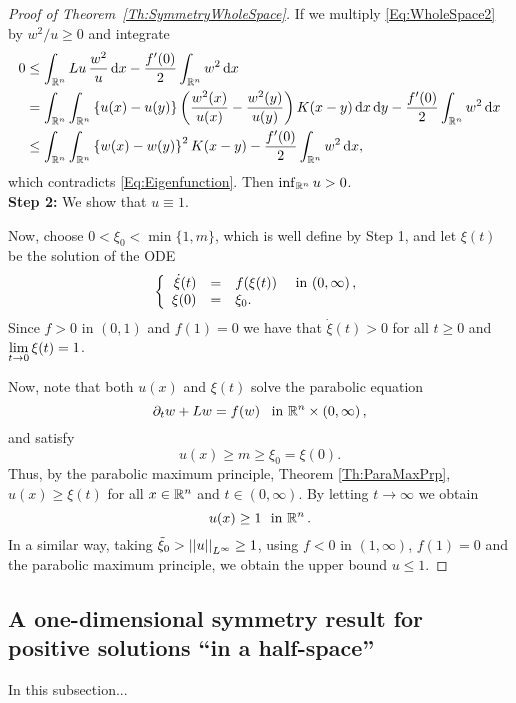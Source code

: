 \begin{proof}[Proof of Theorem~\ref{Th:SymmetryWholeSpace}]
If we multiply \eqref{Eq:WholeSpace2} by $w^2/u\geq 0$ and integrate
\begin{align*}
0 &\leq \int_{\mathbb{R}^n} Lu\,\frac{w^2}{u} \,\mathrm{d} x - \frac{f'(0)}{2}\int_{\mathbb{R}^n} w^2 \,\mathrm{d} x \\
&= \int_{\mathbb{R}^n}\int_{\mathbb{R}^n}\left\{ u(x)-u(y) \right\} \left( \frac{w^2(x)}{u(x)}-\frac{w^2(y)}{u(y)} \right) K(x-y) \,\mathrm{d} x \,\mathrm{d} y - \frac{f'(0)}{2}\int_{\mathbb{R}^n} w^2 \,\mathrm{d} x \\
&\leq \int_{\mathbb{R}^n}\int_{\mathbb{R}^n} \left\{ w(x)-w(y)\right\}^2 K(x-y) - \frac{f'(0)}{2}\int_{\mathbb{R}^n} w^2 \,\mathrm{d} x ,
\end{align*}
which contradicts \eqref{Eq:Eigenfunction}. Then $\inf_{\mathbb{R}^n} u >0$.\\

\textbf{Step 2:} We show that $u\equiv 1$.

Now, choose $0<\xi_0<\min\{1,m\}$, which is well define by Step 1, and let $\xi(t)$ be the solution of the ODE
$$
\left\{\begin{array}{rcll}
\dot{\xi}(t) &=& f(\xi(t)) & \textrm{ in }(0,\infty)\,,\\
\xi(0) &=& \xi_0.
\end{array} \right.
$$
Since $f>0$ in $(0,1)$ and $f(1) = 0$ we have that $\dot{\xi}(t)>0$ for all $t\geq 0$ and $\displaystyle \lim_{t\to 0} \xi(t) = 1$.

Now, note that both $u(x)$ and $\xi(t)$ solve the parabolic equation
$$ \partial_t w + Lw = f(w) \,\,\, \textrm{ in }\mathbb{R}^n\times (0,\infty)\,, $$
and satisfy
$$ u(x) \geq m \geq \xi_0 = \xi(0). $$
Thus, by the parabolic maximum principle, Theorem \ref{Th:ParaMaxPrp}, $u(x)\geq \xi(t)$ for all $x\in\mathbb{R}^n$ and $t\in(0,\infty)$. By letting $t \to \infty$ we obtain
$$ u(x) \geq 1 \,\, \textrm{ in }\mathbb{R}^n\,.  $$
In a similar way, taking $\tilde{\xi}_0>\left | \left |{u} \right | \right |_{L^\infty} \geq 1$, using $f<0$ in $(1,\infty)$, $f(1)=0$ and the parabolic maximum principle, we obtain the upper bound $u\leq 1$.

\end{proof}



\subsection{A one-dimensional symmetry result for positive solutions ``in a half-space''} In this subsection...




